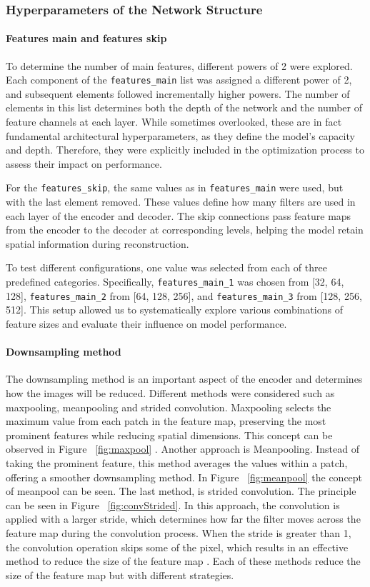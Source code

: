 \documentclass[twocolumn]{article}
\begin{document}
\subsubsection{Hyperparameters of the Network Structure }
\paragraph{Features main and features skip}
To determine the number of main features, different powers of 2 were explored. Each component of the \texttt{features\_main} list was assigned a different power of 2, and subsequent elements followed incrementally higher powers. 
The number of elements in this list determines both the depth of the network and the number of feature channels at each layer. 
While sometimes overlooked, these are in fact fundamental architectural hyperparameters, as they define the model’s capacity and depth. 
Therefore, they were explicitly included in the optimization process to assess their impact on performance.

For the \texttt{features\_skip}, the same values as in \texttt{features\_main} were used, but with the last element removed.  
These values define how many filters are used in each layer of the encoder and decoder.  
The skip connections pass feature maps from the encoder to the decoder at corresponding levels, helping the model retain spatial information during reconstruction.

To test different configurations, one value was selected from each of three predefined categories.  
Specifically, \texttt{features\_main\_1} was chosen from [32, 64, 128], \texttt{features\_main\_2} from [64, 128, 256], and \texttt{features\_main\_3} from [128, 256, 512].  
This setup allowed us to systematically explore various combinations of feature sizes and evaluate their influence on model performance.


\paragraph{Downsampling method}
The downsampling method is an important aspect of the encoder and determines how the images will be reduced. Different methods were considered such as maxpooling, meanpooling and strided convolution.  
Maxpooling selects the maximum value from each patch in the feature map, preserving the most prominent features while reducing spatial dimensions. 
This concept can be observed in Figure ~\ref{fig:maxpool} \cite{dhanushkumar-2023}.
Another approach is Meanpooling. Instead of taking the prominent feature, this method averages the values within a patch, offering a smoother downsampling method. 
In Figure ~\ref{fig:meanpool} the concept of meanpool can be seen.
The last method, is strided convolution. The principle can be seen in Figure ~\ref{fig:convStrided}. 
In this approach, the convolution is applied with a larger stride, which determines how far the filter moves across the feature map during the convolution process.
When the stride is greater than 1, the convolution operation skips some of the pixel, which results in an effective method to reduce the size of the feature map \cite{unknown-author-no-date2}.
Each of these methods reduce the size of the feature map but with different strategies.
\end{document}
